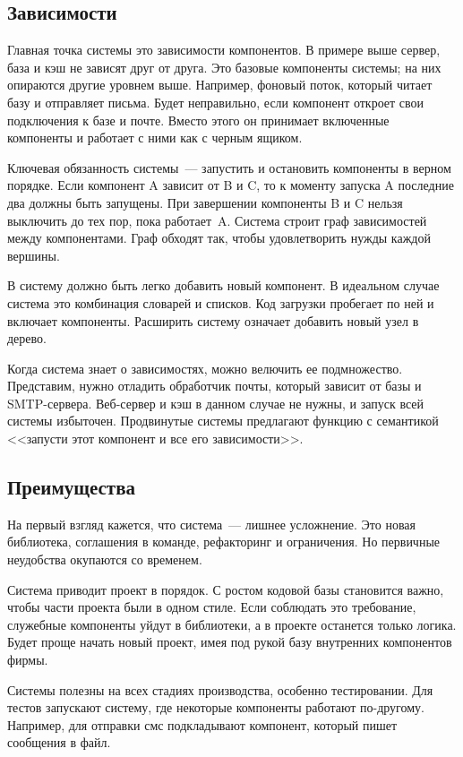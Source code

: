 \subsection{Зависимости}

Главная точка системы это зависимости компонентов. В примере выше сервер, база и
кэш не зависят друг от друга. Это базовые компоненты системы; на них опираются
другие уровнем выше. Например, фоновый поток, который читает базу и отправляет
письма. Будет неправильно, если компонент откроет свои подключения к базе и
почте. Вместо этого он принимает включенные компоненты и работает с ними как с
черным ящиком.

Ключевая обязанность системы~--- запустить и остановить компоненты в верном
порядке. Если компонент A зависит от B и C, то к моменту запуска A последние два
должны быть запущены. При завершении компоненты B и C нельзя выключить до тех
пор, пока работает~A. Система строит граф зависимостей между компонентами. Граф
обходят так, чтобы удовлетворить нужды каждой вершины.

В систему должно быть легко добавить новый компонент. В идеальном случае система
это комбинация словарей и списков. Код загрузки пробегает по ней и включает
компоненты. Расширить систему означает добавить новый узел в дерево.

Когда система знает о зависимостях, можно велючить ее подмножество. Представим,
нужно отладить обработчик почты, который зависит от базы и
SMTP-сервера. Веб-сервер и кэш в данном случае не нужны, и запуск всей системы
избыточен. Продвинутые системы предлагают функцию с семантикой <<запусти этот
компонент и все его зависимости>>.

\subsection{Преимущества}

На первый взгляд кажется, что система~--- лишнее усложнение. Это новая
библиотека, соглашения в команде, рефакторинг и ограничения. Но первичные
неудобства окупаются со временем.

Система приводит проект в порядок. С ростом кодовой базы становится важно, чтобы
части проекта были в одном стиле. Если соблюдать это требование, служебные
компоненты уйдут в библиотеки, а в проекте останется только логика. Будет проще
начать новый проект, имея под рукой базу внутренних компонентов фирмы.

Системы полезны на всех стадиях производства, особенно тестировании. Для тестов
запускают систему, где некоторые компоненты работают по-другому. Например, для
отправки смс подкладывают компонент, который пишет сообщения в файл.

